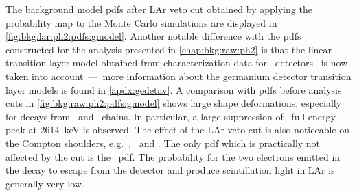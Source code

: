 The background model pdfs after LAr veto cut obtained by applying the probability map to
the Monte Carlo simulations are displayed in \cref{fig:bkg:lar:ph2:pdfs:gmodel}. Another
notable difference with the pdfs constructed for the analysis presented in
\cref{chap:bkg:raw:ph2} is that the linear transition layer model obtained from
characterization data for \bege\ detectors~\cite{Lehnert2016} is now taken into
account~---~more information about the germanium detector transition layer models is found in
\cref{apdx:gedetav}. A comparison with pdfs before analysis cuts in
\cref{fig:bkg:raw:ph2:pdfs:gmodel} shows large shape deformations, especially for decays
from \Uh\ and \Thh\ chains. In particular, a large suppression of \Tl\ full-energy peak at
2614~keV is observed. The effect of the LAr veto cut is also noticeable on the Compton
shoulders, e.g.~\kvn, \kvz\ and \Co. The only pdf which is practically not affected by the
cut is the \nnbb\ pdf. The probability for the two electrons emitted in the decay to
escape from the detector and produce scintillation light in LAr is generally very low.

